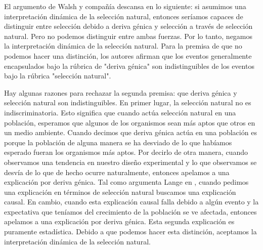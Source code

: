 El argumento de Walsh y compañía descansa en lo siguiente: si asumimos una interpretación dinámica de la selección natural, entonces seríamos capaces de distinguir entre selección debido a deriva génica y selección a través de selección natural. Pero no podemos distinguir entre ambas fuerzas. Por lo tanto, negamos la interpretación dinámica de la selección natural. Para la premisa de que no podemos hacer una distinción, los autores afirman que los eventos generalmente encapsulados bajo la rúbrica de "deriva génica" son indistinguibles de los eventos bajo la rúbrica "selección natural".

Hay algunas razones para rechazar la segunda premisa: que deriva génica y selección natural son indistinguibles. En primer lugar, la selección natural no es indiscriminatoria. Esto significa que cuando actúa selección natural en una población, esperamos que algunos de los organismos sean más aptos que otros en un medio ambiente. Cuando decimos que deriva génica actúa en una población es porque la población de alguna manera se ha desviado de lo que habíamos esperado fueran los organismos más aptos. Por decirlo de otra manera, cuando observamos una tendencia en nuestro diseño experimental y lo que observamos se desvía de lo que de hecho ocurre naturalmente, entonces apelamos a una explicación por deriva génica. Tal como argumenta Lange en \citeyear{Lange2013}, cuando pedimos una explicación en términos de selección natural buscamos una explicación causal. En cambio, cuando esta explicación causal falla debido a algún evento y la expectativa que teníamos del crecimiento de la población se ve afectada, entonces apelamos a una explicación por deriva génica. Esta segunda explicación es puramente estadística. Debido a que podemos hacer esta distinción, aceptamos la interpretación dinámica de la selección natural.

